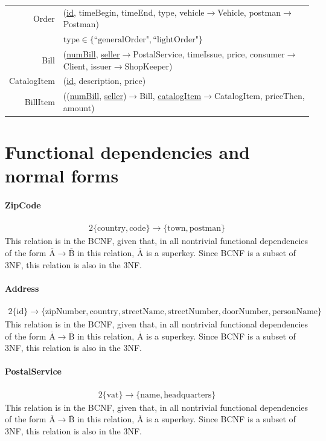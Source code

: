 \documentclass{report}[a4paper]
\theoremstyle{remark}
\begin{document}
\begin{center}
\begin{tabular}{r p{144mm}}
        Order           & (\uline{id}, timeBegin, timeEnd, type, vehicle$\rightarrow$Vehicle, postman$\rightarrow$Postman) \\
                        & $\text{type} \in \{\text{``generalOrder"}, \text{``lightOrder"}\}$\\
        Bill            & (\uline{numBill}, \uline{seller}$\rightarrow$PostalService, timeIssue, price, consumer$\rightarrow$Client, issuer$\rightarrow$ShopKeeper)                                   \\
        CatalogItem     & (\uline{id}, description, price)                           \\
        BillItem        & ((\uline{numBill}, \uline{seller})$\rightarrow$Bill, \uline{catalogItem}$\rightarrow$CatalogItem, priceThen, amount)
    \end{tabular}
\end{center}
\chapter{Functional dependencies and normal forms}
\subsubsection{ZipCode}
\begin{alignat*}{2}
\{\text{country},\text{code}\} \rightarrow \{\text{town}, \text{postman}\}
\end{alignat*}
This relation is in the BCNF, given that, in all nontrivial functional dependencies of the form $\overline{\text{A}} \rightarrow \overline{\text{B}}$ in this relation, $\overline{\text{A}}$ is a superkey. Since BCNF is a subset of 3NF, this relation is also in the 3NF.
\subsubsection{Address}
\begin{alignat*}{2}
\{\text{id}\} \rightarrow \{\text{zipNumber}, \text{country}, \text{streetName}, \text{streetNumber}, \text{doorNumber}, \text{personName}\}
\end{alignat*}
This relation is in the BCNF, given that, in all nontrivial functional dependencies of the form $\overline{\text{A}} \rightarrow \overline{\text{B}}$ in this relation, $\overline{\text{A}}$ is a superkey. Since BCNF is a subset of 3NF, this relation is also in the 3NF.
\subsubsection{PostalService}
\begin{alignat*}{2}
\{\text{vat}\} \rightarrow \{\text{name},\text{headquarters}\}
\end{alignat*}
This relation is in the BCNF, given that, in all nontrivial functional dependencies of the form $\overline{\text{A}} \rightarrow \overline{\text{B}}$ in this relation, $\overline{\text{A}}$ is a superkey. Since BCNF is a subset of 3NF, this relation is also in the 3NF.
\end{document}
